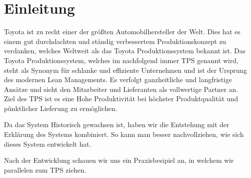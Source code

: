 \documentclass[01_Einleitung.tex]{subfiles}
\begin{document}
\chapter{Einleitung}
\label{chap:Einleitung}
Toyota ist zu recht einer der größten Automobilhersteller der Welt. Dies hat es einem gut durchdachten und ständig verbessertem Produktionskonzept zu verdanken, welches Weltweit als das Toyota Produktionssystem bekannt ist. Das Toyota Produktionssystem, welches im nachfolgend immer TPS genannt wird, steht als Synonym für schlanke und effiziente Unternehmen und ist der Ursprung des modernen Lean Managements. Es verfolgt ganzheitliche und langfristige Ansätze und sieht den Mitarbeiter und Lieferanten als vollwertige Partner an. Ziel des TPS ist es eine Hohe Produktivität bei höchster Produktqualität und pünktlicher Lieferung zu ermöglichen.
 
Da das System Historisch gewachsen ist, haben wir die Entstehung mit der Erklärung des Systems kombiniert. So kann man besser nachvollziehen, wie sich dieses System entwickelt hat.

Nach der Entwicklung schauen wir uns ein Praxisbesipiel an, in welchem wir parallelen zum TPS ziehen.
\end{document}
